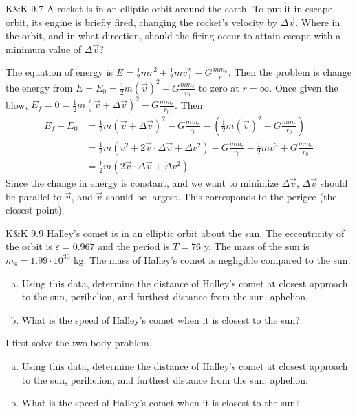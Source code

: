 \documentclass{esg8012pset}
\begin{document}
\begin{problem}{K\&K 9.7}
  A rocket is in an elliptic orbit around the earth. To put it in escape orbit, its engine is briefly fired, changing the rocket's velocity by $\Delta \vec v$. Where in the orbit, and in what direction, should the firing occur to attain escape with a minimum value of $\Delta \vec v$?
\end{problem}
\begin{solution}
The equation of energy is $E = \frac{1}{2} m\dot r^2 + \frac{1}{2}m v_{\bot}^2 - G\frac{m m_e}{r}$.  Then the problem is change the energy from $E = E_0 = \frac{1}{2} m(\vec v)^2 - G\frac{m m_e}{r_0}$ to zero at $r =\infty$.  Once given the blow, $E_f = 0 = \frac{1}{2} m(\vec v + \Delta \vec v)^2 - G\frac{m m_e}{r_0}$.  Then
\begin{align*}
E_f - E_0 & = \frac{1}{2} m(\vec v + \Delta \vec v)^2 - G\frac{m m_e}{r_0} -   \left(\frac{1}{2} m(\vec v)^2 - G\frac{m m_e}{r_0}\right) \\
 & = \frac{1}{2} m(v^2 + 2\vec v\cdot \Delta \vec v + \Delta v^2) - G\frac{m m_e}{r_0} - \frac{1}{2} mv^2 + G\frac{m m_e}{r_0} \\
 & = \frac{1}{2} m(2\vec v\cdot \Delta \vec v + \Delta v^2)
\end{align*}
Since the change in energy is constant, and we want to minimize $\Delta \vec v$, $\Delta \vec v$ should be parallel to $\vec v$, and $\vec v$ should be largest.  This corresponds to the perigee (the closest point).
\end{solution}

\begin{problem}{K\&K 9.9}
  Halley's comet is in an elliptic orbit about the sun. The eccentricity of the orbit is $\varepsilon = 0.967$ and the period is $T = 76$ y. The mass of the sun is $m_s = 1.99 \cdot 10^{30}$ kg.  The mass of Halley's comet is negligible compared to the sun.
  \begin{enumerate}[(a)]
    \item Using this data, determine the distance of Halley's comet at closest approach to the sun, perihelion, and furthest distance from the sun, aphelion.
    \item What is the speed of Halley's comet when it is closest to the sun?
  \end{enumerate}
\end{problem}
\begin{solution}
I first solve the two-body problem.

% 
% 
% 


\begin{enumerate}[(a)]
  \item Using this data, determine the distance of Halley's comet at closest approach to the sun, perihelion, and furthest distance from the sun, aphelion.
  \item What is the speed of Halley's comet when it is closest to the sun?
\end{enumerate}
\end{solution}
\end{document}
